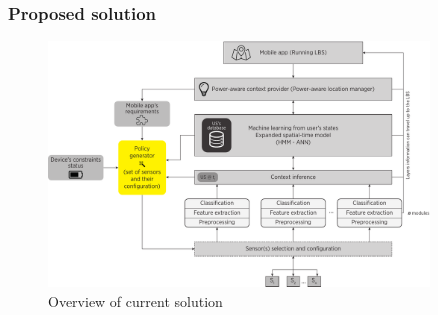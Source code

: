 \documentclass[compress,9pt,xcolor={dvipsnames,table}]{beamer}
\begin{document}
\begin{frame}[t]
\end{frame}

\begin{frame}[t]\frametitle{Proposed solution}
\begin{figure}[tb]
  \centering
  \includegraphics[width=0.9\textwidth]{../../../resources/images/vectors/solution-general-overview}
  \caption{Overview of current solution}
  \label{fig:solution}
\end{figure}
\end{frame}
\end{document}
